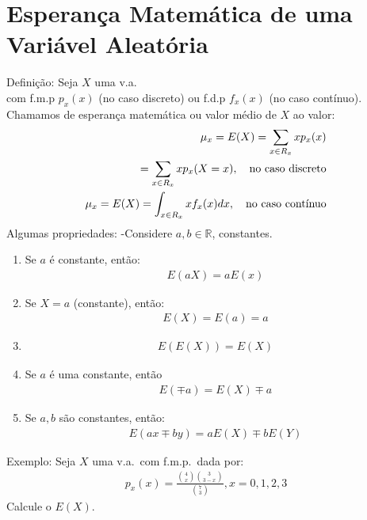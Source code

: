 \documentclass[11pt,a4paper]{article}
\begin{document}
\section{Esperança Matemática de uma Variável Aleatória}
Definição: Seja $X$ uma v.a.\\ com f.m.p $p_{x}(x)$ (no caso discreto) ou f.d.p
$f_{x}(x)$ (no caso contínuo). Chamamos de esperança matemática ou valor médio 
de $X$ ao valor: 
\begin{align}
  \mu_{x}= E(X)= \sum_{x \in R_{x}} x p_{x}(x)\\
  =\sum_{x \in R_{x}} x p_{x}(X=x), \text{\quad no caso discreto}\\
  \mu_{x}= E(X)= \int_{x \in R_{x}} x f_{x}(x)dx, \text{\quad no caso contínuo}
\end{align}
Algumas propriedades:
-Considere $a,b \in \mathbb{R}$, constantes.
\begin{enumerate}[label=(\alph*)]
  \item Se $a$ é constante, então: 
    \begin{align}
      E(aX)=aE(x)
    \end{align}
  \item Se $X=a$ (constante), então: 
    \begin{align}
      E(X)=E(a)=a
    \end{align}
  \item 
    \begin{align}    E(E(X))= E(X)\end{align}
  \item Se $a$ é uma constante, então 
    \begin{align}  E(\mp a)=E(X)\mp a\end{align}
  \item Se $a,b$ são constantes, então: 
    \begin{align}  E(ax\mp by)=aE(X)\mp b E(Y)\end{align}
\end{enumerate}
Exemplo: Seja $X$ uma v.a.\ com f.m.p.\ dada por:
\begin{align}p_{x}(x)=\frac{\binom{4}{x}\binom{3}{3-x}}{\binom{7}{3}}, x=0,1,2,3\end{align}
Calcule o $E(X)$.
\end{document}
